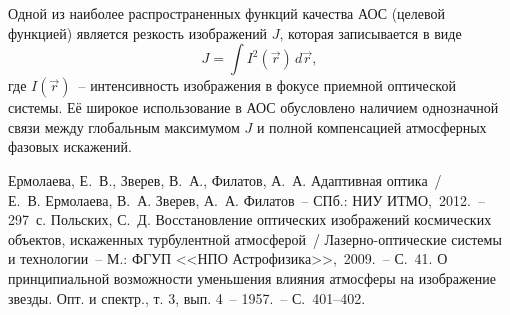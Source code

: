 \documentclass[pscyr]{hedwork}
\begin{document}
Одной из наиболее распространенных функций качества АОС (целевой функцией)
является резкость изображений \( J \), которая записывается в виде
\begin{equation}
  J = \int I^2(\vec{r})\,d\vec{r},
  \label{eq11}
\end{equation}
где \( I(\vec{r}) \)~-- интенсивность изображения в фокусе приемной оптической
системы. Её широкое использование в АОС обусловлено наличием однозначной связи
между глобальным максимумом \( J \) и полной компенсацией атмосферных фазовых
искажений.

\pagebreak %
\renewcommand{\bibname}{Список литературы}

\begin{thebibliography}{9}
   Ермолаева, Е.~В., Зверев, В.~А., Филатов, А.~А. Адаптивная
    оптика~/\\ Е.~В. Ермолаева, В.~А. Зверев, А.~А. Филатов~-- СПб.: НИУ
    ИТМО,~2012.~-- 297~с.
   Польских, С.~Д. Восстановление оптических изображений космических
    объектов, искаженных турбулентной атмосферой~/ Лазерно-оптические системы и
    технологии~-- М.: ФГУП <<НПО Астрофизика>>,~2009.~-- С.~41.
   О принципиальной возможности уменьшения влияния атмосферы на
    изображение звезды. Опт. и спектр., т. 3, вып. 4~-- 1957.~-- С.~401--402.
\end{thebibliography}
\end{document}
